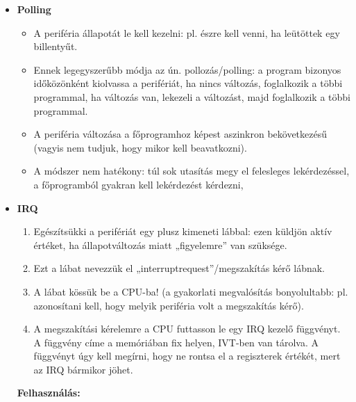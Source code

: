 \documentclass[11pt,a4paper]{article}
\begin{document}
            \begin{tcolorbox}[colback=blue!5!white,colframe=blue!50!black,title= 14. Ismertesse a periféria csatolási módszereket{,} módszerenként kitérve az adott módszer előnyére{,} és hátrányára! Part 1.]
                \begin{itemize}
                    \item \textbf{Polling}
                    \begin{itemize}
                        \item A periféria állapotát le kell kezelni: pl. észre kell venni, ha leütöttek egy billentyűt.
                        \item Ennek legegyszerűbb módja az ún. pollozás/polling: a program bizonyos időközönként kiolvassa a perifériát, ha nincs változás, foglalkozik a többi programmal, ha változás van, lekezeli a változást, majd foglalkozik a többi programmal.
                        \item A periféria változása a főprogramhoz képest aszinkron bekövetkezésű (vagyis nem tudjuk, hogy mikor kell beavatkozni).
                        \item A módszer nem hatékony: túl sok utasítás megy el felesleges lekérdezéssel, a főprogramból gyakran kell lekérdezést kérdezni,
                    \end{itemize}
                    \item \textbf{IRQ}
                    \begin{enumerate}
                        \item Egészítsükki a perifériát egy plusz kimeneti lábbal: ezen küldjön aktív értéket, ha állapotváltozás miatt „figyelemre” van szüksége.
                        \item Ezt a lábat nevezzük el „interruptrequest”/megszakítás kérő lábnak.
                        \item A lábat kössük be a CPU-ba! (a gyakorlati megvalósítás bonyolultabb: pl. azonosítani kell, hogy melyik
                        periféria volt a megszakítás kérő).
                        \item A megszakítási kérelemre a CPU futtasson le egy IRQ kezelő függvényt. A függvény címe a memóriában fix helyen, IVT-ben van tárolva. A függvényt úgy kell megírni, hogy ne rontsa el a regiszterek értékét, mert az IRQ bármikor jöhet.
                    \end{enumerate}
                    \textbf{Felhasználás:}
                    \begin{itemize}

\end{itemize}
\end{itemize}
\end{tcolorbox}
\end{document}
